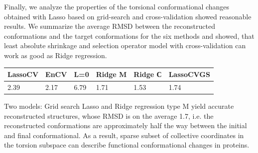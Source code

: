 \documentclass[12pt,twoside]{article}
\begin{document}
Finally, we analyze the properties of the torsional conformational changes obtained with Lasso based on grid-search and cross-validation showed reasonable results. 
We summarize the average RMSD between the reconstructed conformations and the target conformations for the six methods and showed, that least absolute shrinkage and selection operator model with cross-validation can work as good as  Ridge regression. 
\begin{center}

\begin{table}[h]
\begin{tabular}{|l|l|l|l|l|l|}
 \hline
LassoCV & EnCV & L=0  & Ridge M & Ridge С & LassoCVGS \\ \hline
2.39    & 2.17  & 6.79 & 1.71    & 1.53    & 1.74          \\ \hline
\end{tabular}
\end{table}
\end{center}
Two models: Grid search Lasso and Ridge regression type M yield accurate reconstructed structures, whose RMSD is on the average 1.7, i.e. the reconstructed conformations are approximately half the way between the initial and final conformational. As a result, sparse subset of collective coordinates in the torsion subspace can describe functional conformational changes in proteins.
\end{document}
